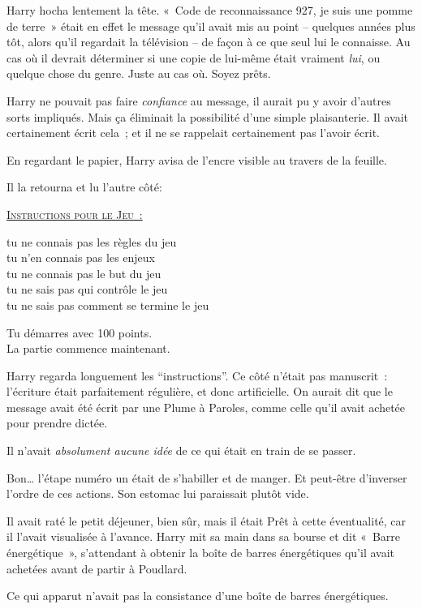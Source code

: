 Harry hocha lentement la tête. «~Code de reconnaissance 927, je suis une pomme de terre~» était en effet le message qu'il avait mis au point -- quelques années plus tôt, alors qu'il regardait la télévision -- de façon à ce que seul lui le connaisse. Au cas où il devrait déterminer si une copie de lui-même était vraiment \emph{lui}, ou quelque chose du genre. Juste au cas où. Soyez prêts.

Harry ne pouvait pas faire \emph{confiance} au message, il aurait pu y avoir d'autres sorts impliqués. Mais ça éliminait la possibilité d'une simple plaisanterie. Il avait certainement écrit cela~; et il ne se rappelait certainement pas l'avoir écrit.

En regardant le papier, Harry avisa de l'encre visible au travers de la feuille.

Il la retourna et lu l'autre côté:

{\ttfamily
  \centering
\textsc{\underline{Instructions pour le Jeu~:}}

tu ne connais pas les règles du jeu\\
tu n'en connais pas les enjeux\\
tu ne connais pas le but du jeu\\
tu ne sais pas qui contrôle le jeu\\
tu ne sais pas comment se termine le jeu

Tu démarres avec 100 points.\\
La partie commence maintenant.\\
}

Harry regarda longuement les “instructions”. Ce côté n'était pas manuscrit~: l'écriture était parfaitement régulière, et donc artificielle. On aurait dit que le message avait été écrit par une Plume à Paroles, comme celle qu'il avait achetée pour prendre dictée.

Il n'avait \emph{absolument aucune idée} de ce qui était en train de se passer.

Bon… l'étape numéro un était de s'habiller et de manger. Et peut-être d'inverser l'ordre de ces actions. Son estomac lui paraissait plutôt vide.

Il avait raté le petit déjeuner, bien sûr, mais il était Prêt à cette éventualité, car il l'avait visualisée à l'avance. Harry mit sa main dans sa bourse et dit «~Barre énergétique~», s'attendant à obtenir la boîte de barres énergétiques qu'il avait achetées avant de partir à Poudlard.

Ce qui apparut n'avait pas la consistance d'une boîte de barres énergétiques.

